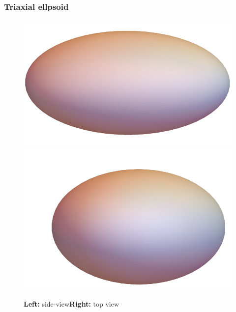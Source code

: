 \documentclass{beamer}
\begin{document}
\begin{frame}
  \frametitle{Triaxial ellpsoid}
  \begin{figure}
    \includegraphics[scale=0.3]{figures/ellipsoid-side-view.pdf}
    \includegraphics[scale=0.3]{figures/ellipsoid-top-view.pdf}
    \caption{\textbf{Left:} side-view\textbf{Right:} top view}
  \end{figure}

\end{frame}
\end{document}
